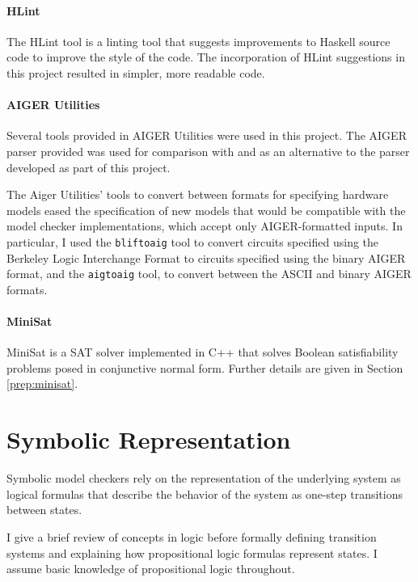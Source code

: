 \documentclass[12pt,a4paper,twoside,openright]{report}
\begin{document}
\paragraph{HLint}{
The HLint tool \cite{hlint} is a linting tool that suggests improvements to Haskell source
code to improve the style of the code.
The incorporation of HLint suggestions in
this project resulted in simpler, more readable code.
}

\paragraph{AIGER Utilities}{
Several tools provided in AIGER Utilities \cite{aiger} were used in this project.
The
AIGER parser provided was used for comparison with and as an alternative
to the parser developed as part of this project. 

The Aiger Utilities' tools to convert between formats for specifying
hardware models eased the specification of new models that would
be compatible with the model checker implementations,
which accept only AIGER-formatted inputs.
In particular, I used the {\tt bliftoaig}
tool to convert circuits specified using the Berkeley Logic Interchange Format
to circuits specified using the binary AIGER format, and the {\tt aigtoaig} tool,
to convert between the ASCII and binary AIGER formats. }

\paragraph{MiniSat}{
MiniSat \cite{minisat,een05}
is a SAT solver implemented in C++ that solves Boolean satisfiability problems
posed in conjunctive normal form. Further details are given in Section \ref{prep:minisat}.
}

\section{Symbolic Representation}
\label{prep:logic}

Symbolic model checkers rely on the representation of the underlying system as
logical formulas that describe the behavior of the system as one-step transitions
between states. %

I give a brief review of concepts in logic before formally defining transition systems
and explaining how propositional logic formulas represent states. I assume basic
knowledge of propositional logic throughout.
\end{document}
